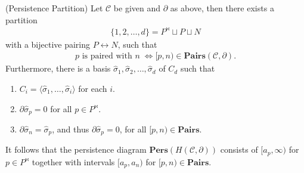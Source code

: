 \begin{theorem}
	{(Persistence Partition) \cite[\S 2.6]{de2011dualities}} \label{persistence
	partition} Let $\mathcal{C}$ be given and $\partial$ as above, then there
	exists a partition
	\begin{align*}
		\{1,2, \ldots, d\} = P^{\Join} \sqcup P \sqcup N
	\end{align*}
	with a bijective pairing $P \leftrightarrow N$, such that
	\begin{align}
		p \text{ is paired with }n \; \iff [p,n) \in \textbf{Pairs}(\mathcal{C}, \partial).
	\end{align}
	Furthermore, there is a basis
	$\hat{\sigma}_{1}, \hat{\sigma}_{2}, \ldots, \hat{\sigma}_{d}$ of $C_{d}$ such
	that
	\begin{enumerate}
		\item $C_{i} = \langle \hat{\sigma}_{1}, \ldots, \hat{\sigma}_{i} \rangle$ for
			each $i$.

		\item $\partial\hat{\sigma}_{p} = 0$ for all $p \in P^{\Join}$.

		\item $\partial\hat{\sigma}_{n} = \hat{\sigma}_{p}$, and thus
			$\partial\hat{\sigma}_{p} = 0$, for all $[p,n) \in \textbf{Pairs}$.
	\end{enumerate}
	It follows that the persistence diagram
	$\textbf{Pers}(H(\mathcal{C},\partial))$ consists of $[a_{p}, \infty)$ for
	$p \in P^{\Join}$ together with intervals $[a_{p},a_{n})$ for
	$[p,n) \in \textbf{Pairs}$.
\end{theorem}


